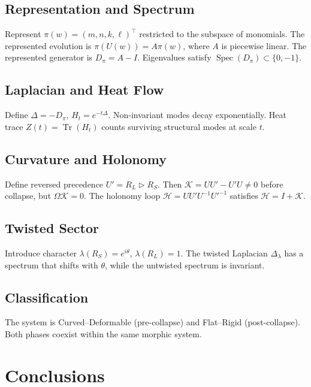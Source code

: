 \documentclass[12pt, oneside]{article}
\DeclareMathOperator{\Tr}{Tr}
\DeclareMathOperator{\Spec}{Spec}
\begin{document}
\subsection{Representation and Spectrum}

Represent $\pi(w) = (m,n,k,\ell)^\top$ restricted to the subspace of monomials. The represented evolution is $\pi(U(w)) = A \pi(w)$, where $A$ is piecewise linear. The represented generator is $D_\pi = A - I$. Eigenvalues satisfy $\Spec(D_\pi) \subset \{0, -1\}$.

\subsection{Laplacian and Heat Flow}

Define $\Delta = -D_\pi$, $H_t = e^{-t\Delta}$. Non-invariant modes decay exponentially. Heat trace $Z(t) = \Tr(H_t)$ counts surviving structural modes at scale $t$.

\subsection{Curvature and Holonomy}

Define reversed precedence $U' = R_L \triangleright R_S$. Then $\mathcal{K} = U U' - U' U \neq 0$ before collapse, but $\Omega \mathcal{K} = 0$. The holonomy loop $\mathcal{H} = U U' U^{-1} U'^{-1}$ satisfies $\mathcal{H} = I + \mathcal{K}$.

\subsection{Twisted Sector}

Introduce character $\lambda(R_S) = e^{i\theta}$, $\lambda(R_L) = 1$. The twisted Laplacian $\Delta_\lambda$ has a spectrum that shifts with $\theta$, while the untwisted spectrum is invariant.

\subsection{Classification}

The system is Curved--Deformable (pre-collapse) and Flat--Rigid (post-collapse). Both phases coexist within the same morphic system.

\section{Conclusions}
\end{document}
